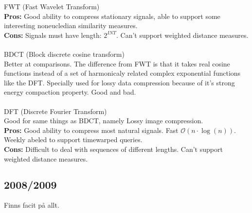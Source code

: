 \documentclass[12pt]{article}
\begin{document}
        FWT (Fast Wavelet Transform)\\
        \textbf{Pros:} Good ability to compress stationary signals, able to support some interesting noneucledian similarity measures.\\ 
        \textbf{Cons:} Signals must have length: $2^{INT}$. Can't support weighted distance measures.\\
        \\
        BDCT (Block discrete cosine transform)\\
        Better at comparisons. The difference from FWT is that it takes real cosine functions instead of a set of harmonicaly related complex
        exponential functions like the DFT. Specially used for lossy data compression because of it's strong energy compaction property. 
        Good and bad.\\
        \\
        DFT (Discrete Fourier Transform)\\
        Good for same things as BDCT, namely Lossy image compression.\\
        \textbf{Pros:} Good ability to compress most natural signals. Fast $\mathcal{O}(n \cdot \log(n))$. 
        Weekly abeled to support timewarped queries. \\
        \textbf{Cons:} Difficult to deal with sequences of different lengths. Can't support weighted distance measures.
        
\subsection*{2008/2009}

    Finns facit på allt.
\end{document}
